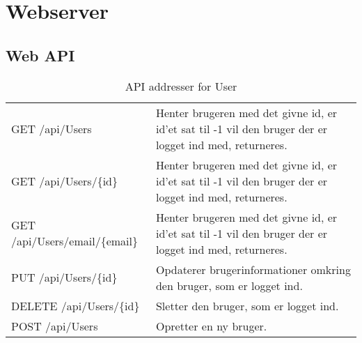 \section{Webserver}

\subsection{Web API}

\begin{table}[H]
	\centering
	\caption{API addresser for User}
	\label{tab:web_user}
	\begin{tabular}{|L{0.3\textwidth}|L{0.70\textwidth}|}
		\hline
		\\
		\hline
		GET \newline
		/api/Users &
		Henter brugeren med det givne id, er id'et sat til -1 vil den bruger der er logget ind med, returneres. \\
        \hline
        GET \newline
		/api/Users/\{id\} &
		Henter brugeren med det givne id, er id'et sat til -1 vil den bruger der er logget ind med, returneres. \\
        \hline
        GET \newline
		/api/Users/email/\{email\} &
		Henter brugeren med det givne id, er id'et sat til -1 vil den bruger der er logget ind med, returneres. \\
        \hline
		PUT \newline
		/api/Users/\{id\} &
		Opdaterer brugerinformationer omkring den bruger, som er logget ind. \\
		\hline
		DELETE \newline
		/api/Users/\{id\} &
		Sletter den bruger, som er logget ind. \\
		\hline
		POST \newline
		/api/Users &
		Opretter en ny bruger. \\
		\hline
	\end{tabular}
\end{table}

